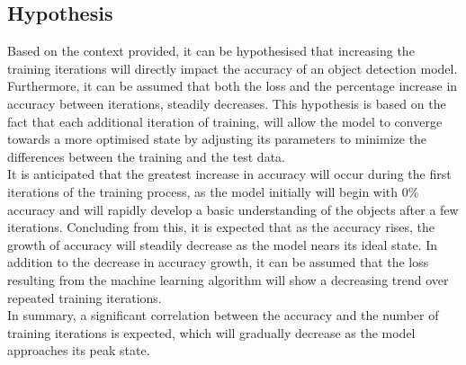 \subsection{Hypothesis}
Based on the context provided, it can be hypothesised that increasing the training iterations will directly impact the accuracy
of an object detection model. Furthermore, it can be assumed that both the loss and the percentage increase in accuracy between 
iterations, steadily decreases. This hypothesis is based on the fact that each additional iteration of training, will allow the model
to converge towards a more optimised state by adjusting its parameters to minimize the differences between the training and the test data.\\
It is anticipated that the greatest increase in accuracy will occur during the first iterations of the training process, as the
model initially will begin with 0\% accuracy and will rapidly develop a basic understanding of the objects after a few iterations. 
Concluding from this, it is expected that as the accuracy rises, the growth of accuracy will steadily decrease as the model nears its 
ideal state. In addition to the decrease in accuracy growth, it can be assumed that the loss resulting from the machine learning algorithm 
will show a decreasing trend over repeated training iterations.\\
In summary, a significant correlation between the accuracy and the number of training iterations is expected, which will gradually decrease as
the model approaches its peak state.

